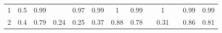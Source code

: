 \documentclass[twoside,11pt]{article}
\begin{document}
\begin{table}[H]
{\begin{tabular}{cccccccclclcc}
\multicolumn{1}{|c|}{1}                                                                           & \multicolumn{1}{c|}{0.5}                                                            & \multicolumn{1}{c|}{0.99}                                                                      & \multicolumn{1}{c|}{\cellcolor[HTML]{FFCCC9}{\color[HTML]{333333} 1}}                    & \multicolumn{1}{c|}{0.97}                                                                & \multicolumn{1}{c|}{\cellcolor[HTML]{ECF4FF}0.99}                                        & \multicolumn{1}{c|}{\cellcolor[HTML]{FFCCC9}1}                                              & \multicolumn{1}{c|}{\cellcolor[HTML]{ECF4FF}0.99}                                           & \multicolumn{1}{l|}{}                                                                          & \multicolumn{1}{c|}{\cellcolor[HTML]{FFCCC9}1}                                              & \multicolumn{1}{l|}{}                    & \multicolumn{1}{c|}{0.99}                                                                      & \multicolumn{1}{c|}{0.99}                                                                      \\ \cline{1-1}
\multicolumn{1}{|c|}{2}                                                                           & \multicolumn{1}{c|}{0.4}                                                            & \multicolumn{1}{c|}{\cellcolor[HTML]{ECF4FF}0.79}                                              & \multicolumn{1}{c|}{0.24}                                                                & \multicolumn{1}{c|}{0.25}                                                                & \multicolumn{1}{c|}{0.37}                                                                & \multicolumn{1}{c|}{\cellcolor[HTML]{FFCCC9}0.88}                                           & \multicolumn{1}{c|}{\cellcolor[HTML]{FFFFFF}0.78}                                           & \multicolumn{1}{l|}{}                                                                          & \multicolumn{1}{c|}{0.31}                                                                   & \multicolumn{1}{l|}{}                    & \multicolumn{1}{c|}{0.86}                                                                      & \multicolumn{1}{c|}{0.81}                                                                      \\ \cline{1-1}

\end{tabular}}
\end{table}
\end{document}
